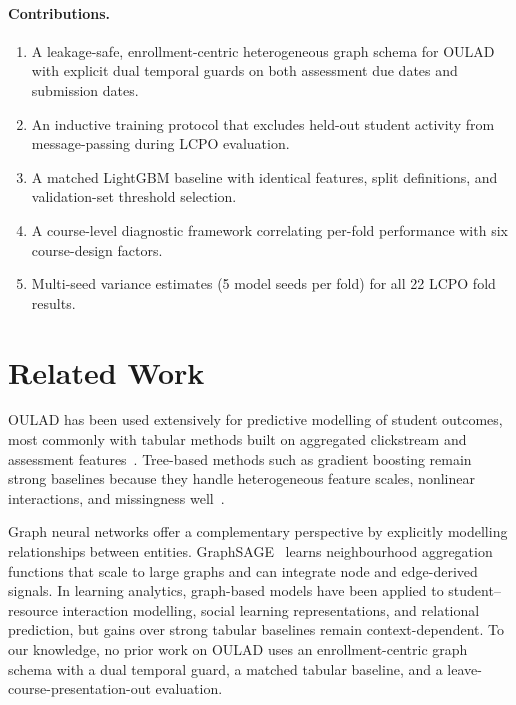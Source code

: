 \documentclass[sigconf,review]{acmart}
\begin{document}
\paragraph{Contributions.}
\begin{enumerate}
  \item A leakage-safe, enrollment-centric heterogeneous graph schema for
        OULAD with explicit dual temporal guards on both assessment due dates
        and submission dates.
  \item An inductive training protocol that excludes held-out student
        activity from message-passing during LCPO evaluation.
  \item A matched LightGBM baseline with identical features, split
        definitions, and validation-set threshold selection.
  \item A course-level diagnostic framework correlating per-fold performance
        with six course-design factors.
  \item Multi-seed variance estimates (5 model seeds per fold) for all
        22 LCPO fold results.
\end{enumerate}

\section{Related Work}
\label{sec:related}

OULAD has been used extensively for predictive modelling of student outcomes,
most commonly with tabular methods built on aggregated clickstream and
assessment features~\cite{kuzilek2017oulad}.  Tree-based methods such as
gradient boosting remain strong baselines because they handle heterogeneous
feature scales, nonlinear interactions, and missingness
well~\cite{ke2017lightgbm}.

Graph neural networks offer a complementary perspective by explicitly
modelling relationships between entities.  GraphSAGE~\cite{hamilton2017sage}
learns neighbourhood aggregation functions that scale to large graphs and can
integrate node and edge-derived signals.  In learning analytics, graph-based
models have been applied to student--resource interaction modelling, social
learning representations, and relational prediction, but gains over strong
tabular baselines remain context-dependent.  To our knowledge, no prior work
on OULAD uses an enrollment-centric graph schema with a dual temporal guard,
a matched tabular baseline, and a leave-course-presentation-out evaluation.
\end{document}
